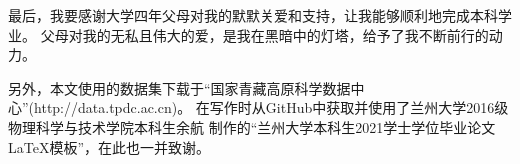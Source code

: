 \documentclass[AutoFakeBold]{LZUThesis}
\begin{document}
最后，我要感谢大学四年父母对我的默默关爱和支持，让我能够顺利地完成本科学业。
父母对我的无私且伟大的爱，是我在黑暗中的灯塔，给予了我不断前行的动力。

另外，本文使用的数据集下载于“国家青藏高原科学数据中心”(http://data.tpdc.ac.cn)。
在写作时从GitHub中获取并使用了兰州大学2016级物理科学与技术学院本科生余航
制作的“兰州大学本科生2021学士学位毕业论文LaTeX模板”，在此也一并致谢。

\rightline{}



\supervisorcomment{}


\committeecomment{}

\finalgrade{}

\Grade %
\end{document}
